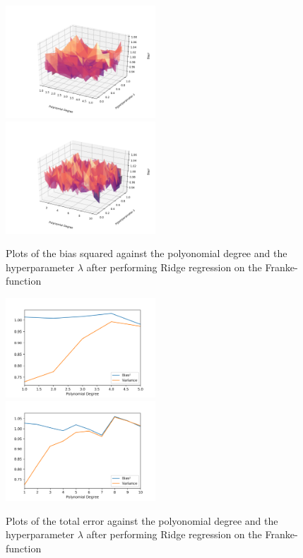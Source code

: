 \documentclass[a4paper,10pt,english]{article}
\begin{document}
\begin{figure}[H]
	\centering 
	\includegraphics[width = 0.5\textwidth, center]{../franke_output/part_D_4.png}
	\includegraphics[width = 0.5\textwidth, center]{../franke_output/part_D_4_highdeg.png}
	\caption{
		Plots of the bias squared against the polyonomial degree and the hyperparameter $\lambda$ after performing Ridge regression on the Franke-function 
	}
	\label{part_d4}
\end{figure}

\begin{figure}[H]
	\centering 
	\includegraphics[width = 0.5\textwidth, center]{../franke_output/part_D_5.png}
	\includegraphics[width = 0.5\textwidth, center]{../franke_output/part_D_5_highdeg.png}
	\caption{
		Plots of the total error against the polyonomial degree and the hyperparameter $\lambda$ after performing Ridge regression on the Franke-function 
	}
	\label{part_d5}
\end{figure}
\end{document}
